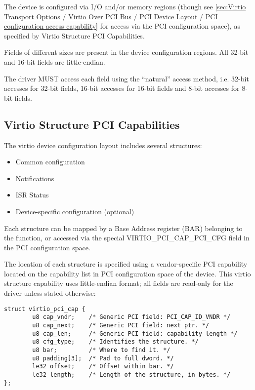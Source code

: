 The device is configured via I/O and/or memory regions (though see
\ref{sec:Virtio Transport Options / Virtio Over PCI Bus / PCI Device Layout / PCI configuration access capability}
for access via the PCI configuration space), as specified by Virtio
Structure PCI Capabilities.

Fields of different sizes are present in the device
configuration regions.
All 32-bit and 16-bit fields are little-endian.


The driver
MUST access each field using the ``natural'' access method, i.e.
32-bit accesses for 32-bit fields, 16-bit accesses for 16-bit
fields and 8-bit accesses for 8-bit fields.

\subsection{Virtio Structure PCI Capabilities}\label{sec:Virtio Transport Options / Virtio Over PCI Bus / Virtio Structure PCI Capabilities}

The virtio device configuration layout includes several structures:
\begin{itemize}
\item Common configuration
\item Notifications
\item ISR Status
\item Device-specific configuration (optional)
\end{itemize}

Each structure can be mapped by a Base Address register (BAR) belonging to
the function, or accessed via the special VIRTIO_PCI_CAP_PCI_CFG field in the PCI configuration space.

The location of each structure is specified using a vendor-specific PCI capability located
on the capability list in PCI configuration space of the device.
This virtio structure capability uses little-endian format; all fields are
read-only for the driver unless stated otherwise:

\begin{lstlisting}
struct virtio_pci_cap {
        u8 cap_vndr;    /* Generic PCI field: PCI_CAP_ID_VNDR */
        u8 cap_next;    /* Generic PCI field: next ptr. */
        u8 cap_len;     /* Generic PCI field: capability length */
        u8 cfg_type;    /* Identifies the structure. */
        u8 bar;         /* Where to find it. */
        u8 padding[3];  /* Pad to full dword. */
        le32 offset;    /* Offset within bar. */
        le32 length;    /* Length of the structure, in bytes. */
};
\end{lstlisting}

